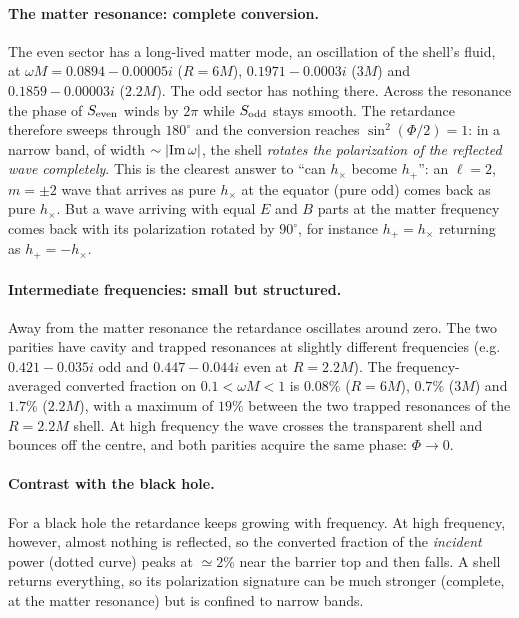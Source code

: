 \paragraph{The matter resonance: complete conversion.} The even sector has a long-lived matter mode, an oscillation of
the shell's fluid, at $\omega M=0.0894-0.00005i$ ($R=6M$), $0.1971-0.0003i$ ($3M$) and $0.1859-0.00003i$ ($2.2M$). The odd sector
has nothing there. Across the resonance the phase of $S_{\rm even}$ winds by $2\pi$ while $S_{\rm odd}$ stays smooth. The
retardance therefore sweeps through $180^\circ$ and the conversion reaches $\sin^2(\Phi/2)=1$: in a narrow band, of width
$\sim|{\rm Im}\,\omega|$, the shell \emph{rotates the polarization of the reflected wave completely}. This is the clearest
answer to ``can $h_\times$ become $h_+$'': an $\ell=2$, $m=\pm2$ wave that arrives as pure $h_\times$ at the equator
(pure odd) comes back as pure $h_\times$. But a wave arriving with equal $E$ and $B$ parts at the matter frequency comes back
with its polarization rotated by $90^\circ$, for instance $h_+=h_\times$ returning as $h_+=-h_\times$.

\paragraph{Intermediate frequencies: small but structured.} Away from the matter resonance the retardance oscillates
around zero. The two parities have cavity and trapped resonances at slightly different frequencies (e.g.\ $0.421-0.035i$
odd and $0.447-0.044i$ even at $R=2.2M$). The frequency-averaged converted fraction on $0.1<\omega M<1$ is $0.08\%$ ($R=6M$),
$0.7\%$ ($3M$) and $1.7\%$ ($2.2M$), with a maximum of $19\%$ between the two trapped resonances of the $R=2.2M$ shell. At high
frequency the wave crosses the transparent shell and bounces off the centre, and both parities acquire the same phase:
$\Phi\to0$.

\paragraph{Contrast with the black hole.} For a black hole the retardance keeps growing with frequency. At high
frequency, however, almost nothing is reflected, so the converted fraction of the \emph{incident} power (dotted curve)
peaks at $\simeq2\%$ near the barrier top and then falls. A shell returns everything, so its polarization
signature can be much stronger (complete, at the matter resonance) but is confined to narrow bands.


